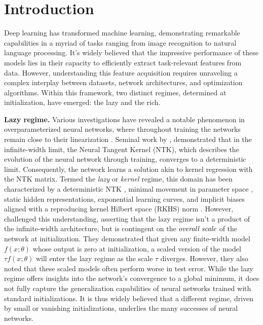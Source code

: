 \documentclass{article}
\theoremstyle{plain}
\theoremstyle{definition}
\theoremstyle{remark}
\begin{document}
\section{Introduction}
\label{sec:introduction}
\vspace{-5pt}



Deep learning has transformed machine learning, demonstrating remarkable capabilities in a myriad of tasks ranging from image recognition to natural language processing. 
% 
It's widely believed that the impressive performance of these models lies in their capacity to efficiently extract task-relevant features from data.
%
However, understanding this feature acquisition requires unraveling a complex interplay between datasets, network architectures, and optimization algorithms.
%
Within this framework, two distinct regimes, determined at initialization, have emerged: the lazy and the rich.


\textbf{Lazy regime.} 
Various investigations have revealed a notable phenomenon in overparameterized neural networks, where throughout training the networks remain close to their linearization \cite{du2018gradient, du2019gradient, allen2019learning, allen2019convergence, zou2020gradient}.
%
Seminal work by \citet{jacot2018neural}, demonstrated that in the infinite-width limit, the Neural Tangent Kernel (NTK), which describes the evolution of the neural network through training, converges to a deterministic limit.
%
Consequently, the network learns a solution akin to kernel regression with the NTK matrix.
%
Termed the \emph{lazy} or \emph{kernel} regime, this domain has been characterized by a deterministic NTK \cite{jacot2018neural, yang2020tensor}, minimal movement in parameter space \cite{chizat2019lazy}, static hidden representations, exponential learning curves, and implicit biases aligned with a reproducing kernel Hilbert space (RKHS) norm \cite{azulay2021implicit}.
%
However, \citet{chizat2019lazy} challenged this understanding, asserting that the lazy regime isn't a product of the infinite-width architecture, but is contingent on the $\emph{overall scale}$ of the network at initialization.
%
They demonstrated that given any finite-width model $f(x;\theta)$ whose output is zero at initialization, a scaled version of the model $\tau f(x;\theta)$ will enter the lazy regime as the scale $\tau$ diverges.
%
However, they also noted that these scaled models often perform worse in test error.
%
While the lazy regime offers insights into the network's convergence to a global minimum, it does not fully capture the generalization capabilities of neural networks trained with standard initializations.
%
It is thus widely believed that a different regime, driven by small or vanishing initializations, underlies the many successes of neural networks.
\end{document}
